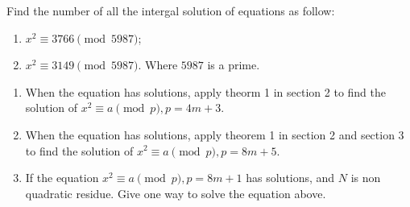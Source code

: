 \documentclass{ctexart}
\newif\ifpreface
\begin{document}
\large
\setlength{\baselineskip}{1.2em}
\ifpreface

\else
{}
\begin{problem}\label{pro:1}
  Find the number of all the intergal solution of equations as follow:
  \begin{enumerate}
    \item \(x^2 \equiv 3766 \pmod{5987}\);
    \item \(x^2 \equiv 3149 \pmod{5987}\).
      Where \(5987\) is a prime.
  \end{enumerate}
\end{problem}
\begin{problem}\label{pro:2}
  \begin{enumerate}
    \item When the equation has solutions, apply theorm 1 in section 2 to
      find the solution of \(x^2 \equiv a \pmod{p}, p=4m + 3\).
    \item When the equation has solutions, apply theorem 1 in section 2 and section 3 to
      find the solution of \(x^2 \equiv a \pmod{p}, p=8m + 5\).
    \item If the equation \(x^2 \equiv a \pmod{p},p=8m + 1\) has solutions, and \(N \) is non quadratic residue.
      Give one way to solve the equation above.
  \end{enumerate}
\end{problem}
\end{document}
